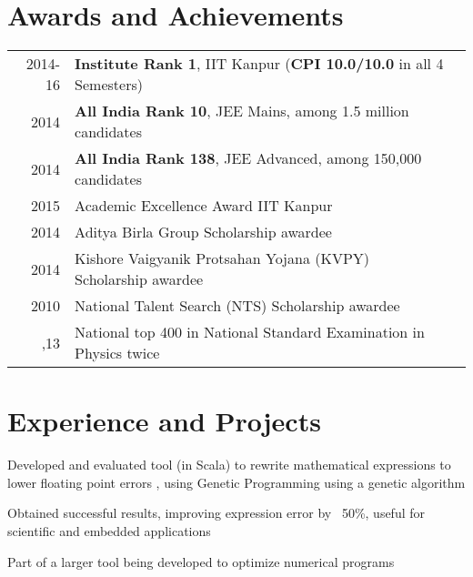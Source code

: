 \documentclass[a4paper]{deedy-resume} %
\newcommand{\onepage}[1]{
  \ifdefined\onep
  #1
  \fi
}
\begin{document}
\begin{minipage}[t]{0.66\textwidth}

  \section{Awards and Achievements}

  \begin{tabular}{rll}
    2014-16	 & \textbf{Institute Rank 1}, IIT Kanpur (\textbf{CPI 10.0/10.0} in all 4 Semesters)\\
    2014	 & \textbf{All India Rank 10}, JEE Mains, among 1.5 million candidates\\
    2014	 & \textbf{All India Rank 138}, JEE Advanced, among 150,000 candidates\\
    2015	 & Academic Excellence Award IIT Kanpur\\
    2014   & Aditya Birla Group Scholarship awardee\\
    2014   & Kishore Vaigyanik Protsahan Yojana (KVPY) Scholarship awardee\\
    2010   & National Talent Search (NTS) Scholarship awardee\\
    \onepage{2012,13 & National top 400 in National Standard
                       Examination in Physics twice}
  \end{tabular}

  \sectionspace


  \section{Experience and Projects}

  \runsubsection{}
  \vspace{\topsep}
  \begin{tightitemize}
  \item Developed and evaluated tool (in Scala) to rewrite
    mathematical expressions to lower floating point errors\onepage{, using
      Genetic Programming} using a genetic algorithm
  \item	Obtained successful results, improving expression error by
    ~50\%, useful for scientific and embedded applications
  \item Part of a larger tool being developed to optimize numerical
    programs
  \end{tightitemize}

  \sectionspace


\end{minipage}
\end{document}

